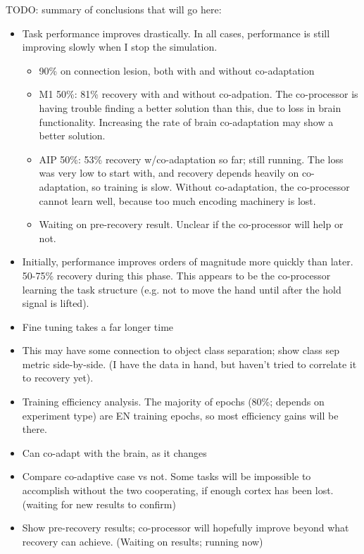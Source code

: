 \documentclass[12pt]{iopart}
\begin{document}
TODO: summary of conclusions that will go here:
\begin{itemize}
	\item Task performance improves drastically. In all cases, performance is still improving slowly when I stop the simulation.
		\begin{itemize}
			\item 90\% on connection lesion, both with and without co-adaptation
			\item M1 50\%: 81\% recovery with and without co-adpation. The co-processor is having trouble finding a better solution than this, due to loss in brain functionality. Increasing the rate of brain co-adaptation may show a better solution.
			\item AIP 50\%: 53\% recovery w/co-adaptation so far; still running. The loss was very low to start with, and recovery depends heavily on co-adaptation, so training is slow. Without co-adaptation, the co-processor cannot learn well, because too much encoding machinery is lost.
			\item Waiting on pre-recovery result. Unclear if the co-processor will help or not.
		\end{itemize}
	\item Initially, performance improves orders of magnitude more quickly than later. 50-75\% recovery during this phase. This appears to be the co-processor learning the task structure (e.g. not to move the hand until after the hold signal is lifted).
	\item Fine tuning takes a far longer time
	\item This may have some connection to object class separation; show class sep metric side-by-side. (I have the data in hand, but haven't tried to correlate it to recovery yet).
	\item Training efficiency analysis. The majority of epochs (80\%; depends on experiment type) are EN training epochs, so most efficiency gains will be there.
	\item Can co-adapt with the brain, as it changes
	\item Compare co-adaptive case vs not. Some tasks will be impossible to accomplish without the two cooperating, if enough cortex has been lost. (waiting for new results to confirm)
	\item Show pre-recovery results; co-processor will hopefully improve beyond what recovery can achieve. (Waiting on results; running now)
\end{itemize}
\end{document}
